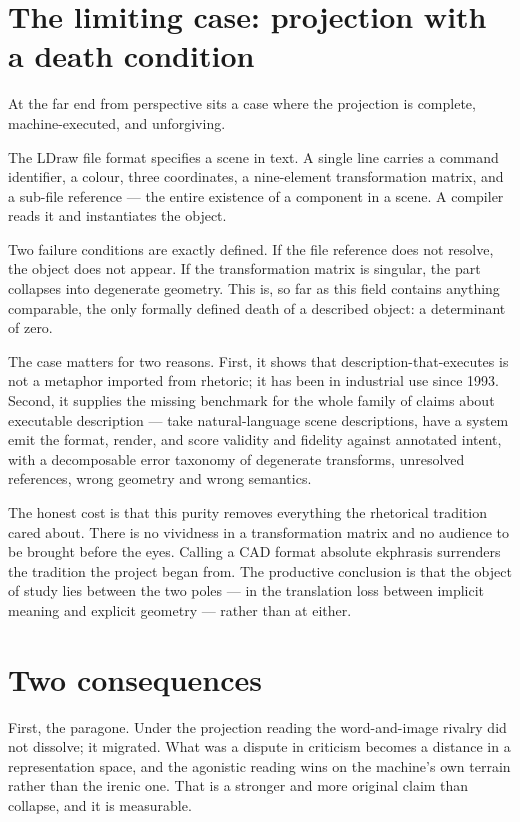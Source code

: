 \documentclass[11pt,a4paper]{article}
\begin{document}
\section{The limiting case: projection with a death condition}
At the far end from perspective sits a case where the projection is complete, machine-executed, and unforgiving.

The LDraw file format specifies a scene in text. A single line carries a command identifier, a colour, three coordinates, a nine-element transformation matrix, and a sub-file reference --- the entire existence of a component in a scene. A compiler reads it and instantiates the object.

Two failure conditions are exactly defined. If the file reference does not resolve, the object does not appear. If the transformation matrix is singular, the part collapses into degenerate geometry. This is, so far as this field contains anything comparable, the only formally defined death of a described object: a determinant of zero.

The case matters for two reasons. First, it shows that description-that-executes is not a metaphor imported from rhetoric; it has been in industrial use since 1993. Second, it supplies the missing benchmark for the whole family of claims about executable description --- take natural-language scene descriptions, have a system emit the format, render, and score validity and fidelity against annotated intent, with a decomposable error taxonomy of degenerate transforms, unresolved references, wrong geometry and wrong semantics.

The honest cost is that this purity removes everything the rhetorical tradition cared about. There is no vividness in a transformation matrix and no audience to be brought before the eyes. Calling a CAD format absolute ekphrasis surrenders the tradition the project began from. The productive conclusion is that the object of study lies between the two poles --- in the translation loss between implicit meaning and explicit geometry --- rather than at either.

\section{Two consequences}
First, the paragone. Under the projection reading the word-and-image rivalry did not dissolve; it migrated. What was a dispute in criticism becomes a distance in a representation space, and the agonistic reading wins on the machine's own terrain rather than the irenic one. That is a stronger and more original claim than collapse, and it is measurable.
\end{document}
